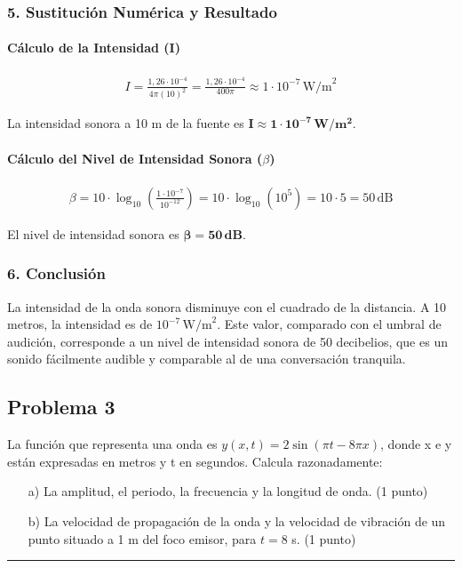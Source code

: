 \subsubsection*{5. Sustitución Numérica y Resultado}
\paragraph*{Cálculo de la Intensidad (I)}
\begin{gather}
    I = \frac{1,26 \cdot 10^{-4}}{4\pi (10)^2} = \frac{1,26 \cdot 10^{-4}}{400\pi} \approx 1 \cdot 10^{-7} \, \text{W/m}^2
\end{gather}
\begin{cajaresultado}
La intensidad sonora a 10 m de la fuente es $\boldsymbol{I \approx 1 \cdot 10^{-7} \, W/m^2}$.
\end{cajaresultado}
\paragraph*{Cálculo del Nivel de Intensidad Sonora ($\beta$)}
\begin{gather}
    \beta = 10 \cdot \log_{10}\left(\frac{1 \cdot 10^{-7}}{10^{-12}}\right) = 10 \cdot \log_{10}(10^5) = 10 \cdot 5 = 50 \, \text{dB}
\end{gather}
\begin{cajaresultado}
El nivel de intensidad sonora es $\boldsymbol{\beta = 50 \, dB}$.
\end{cajaresultado}

\subsubsection*{6. Conclusión}
\begin{cajaconclusion}
La intensidad de la onda sonora disminuye con el cuadrado de la distancia. A 10 metros, la intensidad es de $10^{-7} \, \text{W/m}^2$. Este valor, comparado con el umbral de audición, corresponde a un nivel de intensidad sonora de 50 decibelios, que es un sonido fácilmente audible y comparable al de una conversación tranquila.
\end{cajaconclusion}

\newpage

\subsection{Problema 3}
\label{subsec:P3_2022_jun_ord}

\begin{cajaenunciado}
La función que representa una onda es $y(x,t) = 2 \sin(\pi t - 8\pi x)$, donde x e y están expresadas en metros y t en segundos. Calcula razonadamente:
\begin{enumerate}
    \item[a)] La amplitud, el periodo, la frecuencia y la longitud de onda. (1 punto) 
    \item[b)] La velocidad de propagación de la onda y la velocidad de vibración de un punto situado a 1 m del foco emisor, para $t=8$ s. (1 punto) 
\end{enumerate}
\end{cajaenunciado}
\hrule

